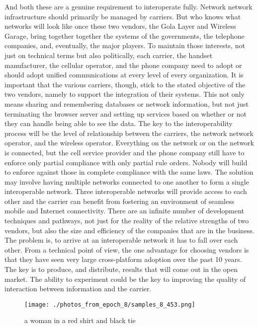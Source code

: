 \documentclass{article}%
\begin{document}
And both these are a genuine requirement to interoperate fully. Network network infrastructure should primarily be managed by carriers. But who knows what networks will look like once these two vendors, the Gola Layer and Wireless Garage, bring together together the systems of the governments, the telephone companies, and, eventually, the major players.\newline%
To maintain those interests, not just on technical terms but also politically, each carrier, the handset manufacturer, the cellular operator, and the phone company need to adopt or should adopt unified communications at every level of every organization.\newline%
It is important that the various carriers, though, stick to the stated objective of the two vendors, namely to support the integration of their systems. This not only means sharing and remembering databases or network information, but not just terminating the browser server and setting up services based on whether or not they can handle being able to see the data.\newline%
The key to the interoperability process will be the level of relationship between the carriers, the network network operator, and the wireless operator. Everything on the network or on the network is connected, but the cell service provider and the phone company still have to enforce only partial compliance with only partial rule orders. Nobody will build to enforce against those in complete compliance with the same laws.\newline%
The solution may involve having multiple networks connected to one another to form a single interoperable network. Three interoperable networks will provide access to each other and the carrier can benefit from fostering an environment of seamless mobile and Internet connectivity.\newline%
There are an infinite number of development techniques and pathways, not just for the reality of the relative strengths of two vendors, but also the size and efficiency of the companies that are in the business. The problem is, to arrive at an interoperable network it has to fall over each other.\newline%
From a technical point of view, the one advantage for choosing vendors is that they have seen very large cross{-}platform adoption over the past 10 years. The key is to produce, and distribute, results that will come out in the open market. The ability to experiment could be the key to improving the quality of interaction between information and the carrier.\newline%

%


\begin{figure}[h!]%
\centering%
\texttt{[image: ./photos\_from\_epoch\_8/samples\_8\_453.png]}%
\caption{a woman in a red shirt and black tie}%
\end{figure}

%
\end{document}
